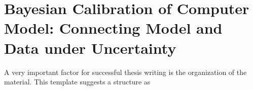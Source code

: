\chapter[Bayesian Calibration]{Bayesian Calibration of Computer Model: Connecting Model and Data under Uncertainty}\label{ch:bayesian_calibration}

A very important factor for successful thesis writing is the
organization of the material. This template suggests a structure as










